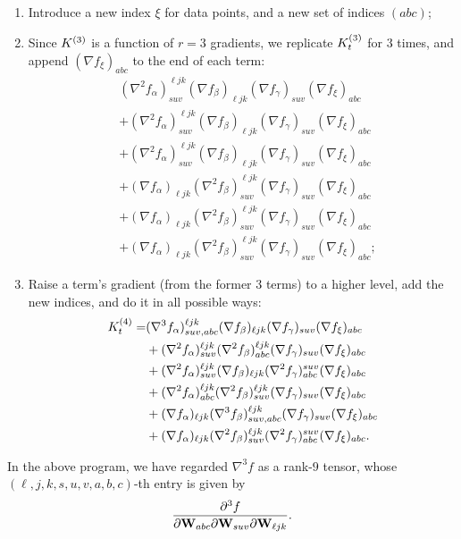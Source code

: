 \begin{enumerate}
	\item Introduce a new index $\xi$ for data points, and a new set of indices $(abc)$;
	\item Since ${K}^{(3)}$ is a function of $r = 3$ gradients, we replicate ${K}^{(3)}_t$ for $3$ times, and append $(\nabla f_\xi)_{abc}$ to the end of each term:
	\begin{align*}
		& (\nabla^2 f_\alpha)^{\ell j k }_{suv} (\nabla f_\beta)_{\ell j k} (\nabla f_\gamma)_{suv} (\nabla f_\xi)_{abc} \\
		& + (\nabla^2 f_\alpha)^{\ell j k }_{suv} (\nabla f_\beta)_{\ell j k} (\nabla f_\gamma)_{suv} (\nabla f_\xi)_{abc} \\
		& + (\nabla^2 f_\alpha)^{\ell j k }_{suv} (\nabla f_\beta)_{\ell j k} (\nabla f_\gamma)_{suv} (\nabla f_\xi)_{abc}  \\
		& +  (\nabla f_\alpha)_{\ell j k } (\nabla^2 f_\beta)^{\ell j k}_{s u v} (\nabla f_\gamma)_{suv}  (\nabla f_\xi)_{abc}\\
		& +  (\nabla f_\alpha)_{\ell j k } (\nabla^2 f_\beta)^{\ell j k}_{s u v} (\nabla f_\gamma)_{suv} (\nabla f_\xi)_{abc}\\
		& +  (\nabla f_\alpha)_{\ell j k } (\nabla^2 f_\beta)^{\ell j k}_{s u v} (\nabla f_\gamma)_{suv}  (\nabla f_\xi)_{abc};
	\end{align*}	
	\item Raise a term's gradient (from the former $3$ terms) to a higher level, add the new indices, and do it in all possible ways:
	\begin{align}
		{K}^{(4)}_t = &   (\nabla^3 f_\alpha)^{\ell j k }_{suv, abc} (\nabla f_\beta)_{\ell j k} (\nabla f_\gamma)_{suv} (\nabla f_\xi)_{abc}\nonumber \\
		& + (\nabla^2 f_\alpha)^{\ell j k }_{suv} (\nabla^2 f_\beta)^{\ell j k}_{abc} (\nabla f_\gamma)_{suv} (\nabla f_\xi)_{abc} \nonumber\\
		& + (\nabla^2 f_\alpha)^{\ell j k }_{suv} (\nabla f_\beta)_{\ell j k} (\nabla^2 f_\gamma)^{suv}_{abc} (\nabla f_\xi)_{abc} \nonumber \\
		& +  (\nabla^2 f_\alpha)^{\ell j k }_{abc} (\nabla^2 f_\beta)^{\ell j k}_{s u v} (\nabla f_\gamma)_{suv}  (\nabla f_\xi)_{abc} \nonumber\\
		& +  (\nabla f_\alpha)_{\ell j k } (\nabla^3 f_\beta)^{\ell j k}_{s u v, abc} (\nabla f_\gamma)_{suv} (\nabla f_\xi)_{abc} \nonumber\\
		\label{eq: K_4_general}
		& +  (\nabla f_\alpha)_{\ell j k } (\nabla^2 f_\beta)^{\ell j k}_{s u v} (\nabla^2 f_\gamma)^{suv}_{abc}  (\nabla f_\xi)_{abc}.
	\end{align}
\end{enumerate}
In the above program, we have regarded $\nabla^3 f$ as a rank-$9$ tensor, whose $(\ell, j, k, s, u, v, a, b, c)$-th entry is given by
\[
	\frac{\partial^3 f}{\partial {\mathbf{W}} _{abc} {\partial} {\mathbf{W}} _{suv} {\partial} {\mathbf{W}} _{\ell j k} }.
\]

